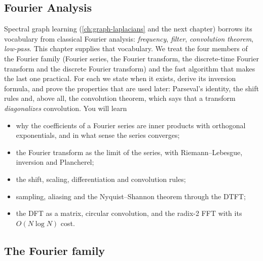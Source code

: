 \begin{notechapter}
\providecommand{\sinc}{\operatorname{sinc}}
\providecommand{\rect}{\operatorname{rect}}
\providecommand{\fourier}{\mathcal{F}}
\chapter{Fourier Analysis}\label{ch:fourier-analysis}

\begin{chapterintro}
Spectral graph learning (\cref{ch:graph-laplacians} and the next chapter) borrows its vocabulary from classical Fourier analysis: \emph{frequency}, \emph{filter}, \emph{convolution theorem}, \emph{low-pass}. This chapter supplies that vocabulary. We treat the four members of the Fourier family (Fourier series, the Fourier transform, the discrete-time Fourier transform and the discrete Fourier transform) and the fast algorithm that makes the last one practical. For each we state when it exists, derive its inversion formula, and prove the properties that are used later: Parseval's identity, the shift rules and, above all, the convolution theorem, which says that a transform \emph{diagonalizes} convolution. You will learn
\begin{itemize}[nosep]
  \item why the coefficients of a Fourier series are inner products with orthogonal exponentials, and in what sense the series converges;
  \item the Fourier transform as the limit of the series, with Riemann--Lebesgue, inversion and Plancherel;
  \item the shift, scaling, differentiation and convolution rules;
  \item sampling, aliasing and the Nyquist--Shannon theorem through the DTFT;
  \item the DFT as a matrix, circular convolution, and the radix-2 FFT with its $O(N\log N)$ cost.
\end{itemize}
\end{chapterintro}

\section{The Fourier family}


\end{notechapter}
